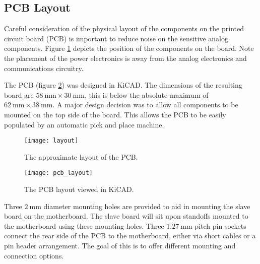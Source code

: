 \subsection{PCB Layout}
\label{sec:pcb-layout}

Careful consideration of the physical layout of the components on the printed circuit board (PCB) is important to reduce noise on the sensitive analog components.
Figure \ref{fig:layout} depicts the position of the components on the board.
Note the placement of the power electronics is away from the analog electronics and communications circuitry.

The PCB (figure \ref{fig:pcb-layout}) was designed in KiCAD.
The dimensions of the resulting board are $\SI{58}{\milli\metre}\times\SI{30}{\milli\metre}$, this is below the absolute maximum of $\SI{62}{\milli\metre}\times\SI{38}{\milli\metre}$.
A major design decision was to allow all components to be mounted on the top side of the board.
This allows the PCB to be easily populated by an automatic pick and place machine.
\begin{figure}[H]
	\centering
	\texttt{[image: layout]}
	\caption{The approximate layout of the PCB.}
	\label{fig:layout}
\end{figure}

\begin{figure}[H]
	\centering
	\texttt{[image: pcb\_layout]}
	\caption{The PCB layout viewed in KiCAD.}
	\label{fig:pcb-layout}
\end{figure}

Three $\SI{2}{\milli\metre}$ diameter mounting holes are provided to aid in mounting the slave board on the motherboard.
The slave board will sit upon standoffs mounted to the motherboard using these mounting holes.
Three $\SI{1.27}{\milli\metre}$ pitch pin sockets connect the rear side of the PCB to the motherboard, either via short cables or a pin header arrangement.
The goal of this is to offer different mounting and connection options.
